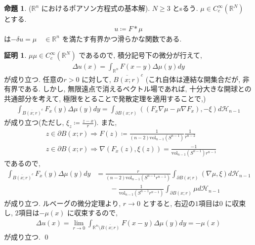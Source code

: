 \documentclass[10pt, fleqn, label-section=none]{bxjsarticle}
\theoremstyle{definition}
\newtheorem{prop}[dfn]{命題}
\newtheorem*{pf*}{証明}
\newcommand{\naraba}{\Rightarrow}
\newcommand{\vol}{\textrm{vol}}
\renewcommand{\;}{\, ; \,}
\begin{document}
\begin{prop}($\mathbb R^n$ におけるポアソン方程式の基本解).  $N \geq 3$ とsるう. $\mu \in C_c^\infty (\mathbb R^N)$ とする. 
\begin{align*} u \coloneqq F * \mu \end{align*}
は$- \delta u = \mu \quad \in \mathbb R^n$ を満たす有界かつ滑らかな関数である. 
\end{prop}
\begin{pf*}$\mu \mu \in C_c^\infty (\mathbb R^N)$ であるので, 積分記号下の微分が行えて, 
\begin{align*} \Delta u (x) = \int_{\mathbb R^n} F(x-y) \Delta \mu (y) d y\end{align*}
が成り立つ.  任意の$r > 0$ に対して, $\overline{B(x; r)}^c$ (これ自体は連結な開集合だが, 非有界である. しかし, 無限遠点で消えるベクトル場であれば, 十分大きな開球との共通部分を考えて, 極限をとることで発散定理を適用することで,) 
\begin{align*} \int_{\overline{B(x; r)}^c } F_x(y) \Delta \mu(y) d y = \int_{\partial B(x;r)} ((F_x \nabla \mu - \mu \nabla F_x) , - \xi ) d \mathcal H_{n-1} \end{align*}
が成り立つ(ただし, $\xi_z \coloneqq \frac{z-x}{r}$). また, 
\begin{align*} &z \in \partial B(x;r) \naraba F(z) \coloneqq \frac{1}{(n-2)\vol_{n-1} (S^{n-1}   )      } \frac{1}{ r ^{n-2}} \\ &z \in \partial B(x;r) \naraba  \nabla (F_x (z), \xi(z) ) = \frac{-1}{  \vol_{n-1} (S^{n-1})  r^{n-1} }   \end{align*}
であるので, 
\begin{align*}\int_{\overline{B(x; r)}^c } F_x(y) \Delta \mu(y) d y  &=  \frac{r}{(n-2) \vol_{n-1} (S^{n-1} r^{n-1}) } \int_{\partial B(x;r)}(\nabla \mu , \xi) d\mathcal H_{n-1} \\& \quad \quad - \frac{1}{\vol_{n-1} (S^{n-1} r^{n-1})}\int_{\partial B(x;r)} \mu d \mathcal H_{n-1}  \end{align*}
が成り立つ. ルベーグの微分定理より, $r \rightarrow 0$ とすると, 右辺の$1$項目は$0$ に収束し, $2$項目は$-\mu(x)$ に収束するので, 
\begin{align*} \Delta u (x) = \lim_{r \rightarrow 0} \int_{\mathbb R^n \setminus \overline{B(x; r)}} F(x-y) \Delta \mu (y) d y = - \mu(x) \end{align*}
が成り立つ. 
\qed
\end{pf*}
\end{document}
